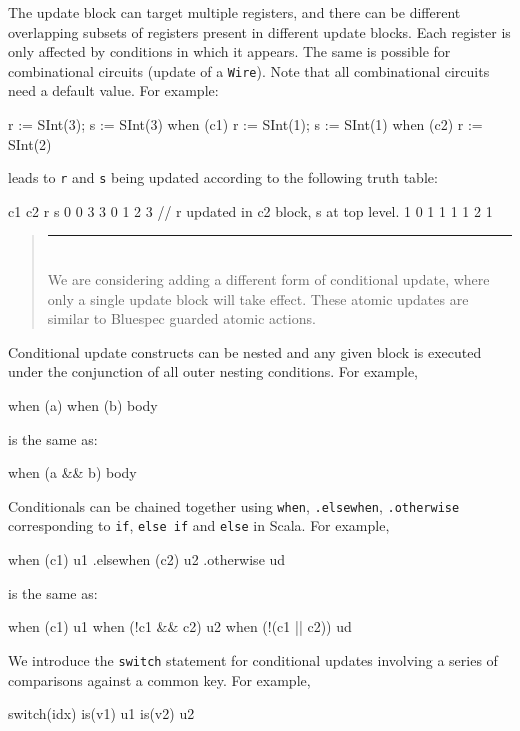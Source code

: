 \documentclass[twocolumn,10pt]{article}
\newenvironment{commentary}
{ \vspace{-0.1in}
  \begin{quotation}
  \noindent
  \small \em
  \rule{\linewidth}{1pt}\\
}
{
  \end{quotation}
}
\def\code#1{{\tt #1}}
\begin{document}
The update block can target multiple registers, and there can be
different overlapping subsets of registers present in different update
blocks.  Each register is only affected by conditions in which it
appears.  The same is possible for combinational circuits (update
of a \code{Wire}). Note that all combinational
circuits need a default value. For example:
\begin{scala}
r := SInt(3); s := SInt(3)
when (c1)   { r := SInt(1); s := SInt(1) }
when (c2)   { r := SInt(2) }
\end{scala}

\noindent
leads to \code{r} and \code{s} being updated according to the
following truth table:
\begin{scala}
c1 c2  r  s
0   0  3  3
0   1  2  3 // r updated in c2 block, s at top level.
1   0  1  1
1   1  2  1
\end{scala}

\begin{commentary}
We are considering adding a different form of conditional update,
where only a single update block will take effect.  These atomic
updates are similar to Bluespec guarded atomic actions.
\end{commentary}

Conditional update constructs can be nested and any given block is
executed under the conjunction of all outer nesting conditions.  For
example,
\begin{scala}
when (a) { when (b) { body } }
\end{scala}

\noindent
is the same as:
\begin{scala}
when (a && b) { body }
\end{scala}

Conditionals can be chained together using
\verb+when+, \verb+.elsewhen+, \verb+.otherwise+ corresponding to
\verb+if+, \verb+else if+ and \verb+else+ in Scala.  For example,
\begin{scala}
when (c1) { u1 }
.elsewhen (c2) { u2 }
.otherwise { ud }
\end{scala}
\noindent
is the same as:
\begin{scala}
when (c1) { u1 }
when (!c1 && c2) { u2 }
when (!(c1 || c2)) { ud }
\end{scala}

We introduce the \code{switch} statement for conditional updates
involving a series of comparisons against a common key.  For example,
\begin{scala}
switch(idx) {
 is(v1) { u1 }
 is(v2) { u2 }
}
\end{scala}
\end{document}
